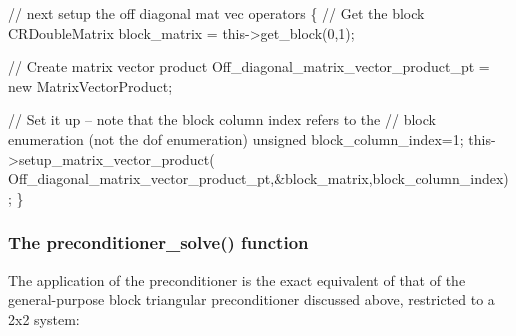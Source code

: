 \begin{DoxyCodeInclude}
  \textcolor{comment}{// next setup the off diagonal mat vec operators}
  \{
   \textcolor{comment}{// Get the block}
   CRDoubleMatrix block\_matrix = this->get\_block(0,1);

   \textcolor{comment}{// Create matrix vector product}
   Off\_diagonal\_matrix\_vector\_product\_pt = \textcolor{keyword}{new} MatrixVectorProduct;

   \textcolor{comment}{// Set it up -- note that the block column index refers to the}
   \textcolor{comment}{// block enumeration (not the dof enumeration)}
   \textcolor{keywordtype}{unsigned} block\_column\_index=1;
   this->setup\_matrix\_vector\_product(
    Off\_diagonal\_matrix\_vector\_product\_pt,&block\_matrix,block\_column\_index);
  \}

\end{DoxyCodeInclude}
\hypertarget{index_two_plus_three_upper_triangular_solve}{}\subsubsection{The preconditioner\+\_\+solve() function}\label{index_two_plus_three_upper_triangular_solve}
The application of the preconditioner is the exact equivalent of that of the general-\/purpose block triangular preconditioner discussed above, restricted to a 2x2 system\+:


